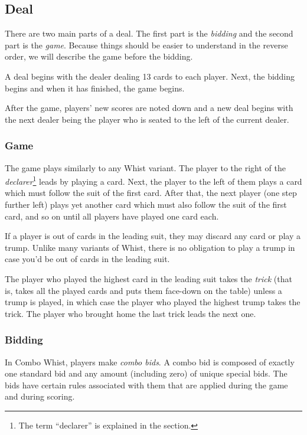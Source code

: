 \documentclass[a4paper]{article}
\begin{document}
		\subsection{Deal}
			There are two main parts of a deal. The first part is the \emph{bidding} and the second part is the \emph{game}. Because things should be easier to understand in the reverse order, we will describe the game before the bidding.

			A deal begins with the dealer dealing 13 cards to each player. Next, the bidding begins and when it has finished, the game begins.

			After the game, players' new scores are noted down and a new deal begins with the next dealer being the player who is seated to the left of the current dealer.

			\subsubsection{Game}
				The game plays similarly to any Whist variant. The player to the right of the \emph{declarer}\footnote{The term ``declarer'' is explained in the \textit{} section.} leads by playing a card. Next, the player to the left of them plays a card which must follow the suit of the first card. After that, the next player (one step further left) plays yet another card which must also follow the suit of the first card, and so on until all players have played one card each.

				If a player is out of cards in the leading suit, they may discard any card or play a trump. Unlike many variants of Whist, there is no obligation to play a trump in case you'd be out of cards in the leading suit.

				The player who played the highest card in the leading suit takes the \emph{trick} (that is, takes all the played cards and puts them face-down on the table) unless a trump is played, in which case the player who played the highest trump takes the trick. The player who brought home the last trick leads the next one.

			\subsubsection{Bidding}
				\label{sec:bidding}
				In Combo Whist, players make \emph{combo bids}. A combo bid is composed of exactly one standard bid and any amount (including zero) of unique special bids. The bids have certain rules associated with them that are applied during the game and during scoring.
\end{document}

